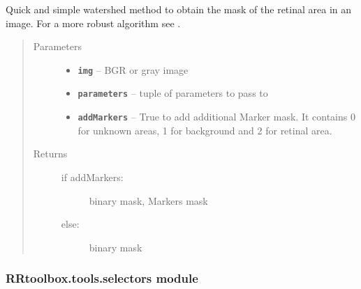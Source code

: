 \documentclass[letterpaper,10pt,english]{sphinxmanual}
\begin{document}
\begin{fulllineitems}
\label{RRtoolbox.tools:RRtoolbox.tools.segmentation.retinal_mask_watershed}
Quick and simple watershed method to obtain the mask of the retinal area in an image.
For a more robust algorithm see {\hyperref[RRtoolbox.tools:RRtoolbox.tools.segmentation.retinal_mask]{\emph{}}}.
\begin{quote}\begin{description}
\item[{Parameters}] \leavevmode\begin{itemize}
\item {} 
\textbf{\texttt{img}} -- BGR or gray image

\item {} 
\textbf{\texttt{parameters}} -- tuple of parameters to pass to 

\item {} 
\textbf{\texttt{addMarkers}} -- True to add additional Marker mask. It contains 0 for unknown
areas, 1 for background and 2 for retinal area.

\end{itemize}

\item[{Returns}] \leavevmode
\begin{description}
\item[{if addMarkers:}] \leavevmode
binary mask, Markers mask

\item[{else:}] \leavevmode
binary mask

\end{description}


\end{description}\end{quote}

\end{fulllineitems}



\subsubsection{RRtoolbox.tools.selectors module}
\label{RRtoolbox.tools:module-RRtoolbox.tools.selectors}\label{RRtoolbox.tools:rrtoolbox-tools-selectors-module}
\end{document}
